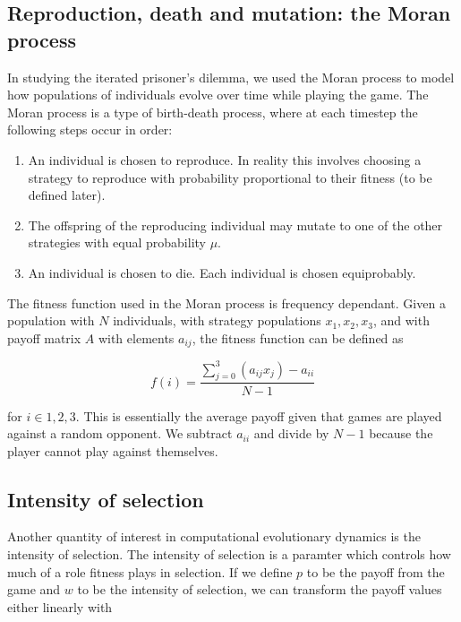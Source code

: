 \subsection{Reproduction, death and mutation: the Moran process}

In studying the iterated prisoner's dilemma, we used the Moran process to model how populations of individuals evolve over time while playing the game.
The Moran process is a type of birth-death process, where at each timestep the following steps occur in order:

\begin{enumerate}
    \item An individual is chosen to reproduce. In reality this involves choosing a strategy to reproduce with probability proportional to their fitness (to be defined later).
    \item The offspring of the reproducing individual may mutate to one of the other strategies with equal probability $\mu$.
    \item An individual is chosen to die. Each individual is chosen equiprobably.
\end{enumerate}

The fitness function used in the Moran process is frequency dependant.
Given a population with $N$ individuals, with strategy populations $x_1, x_2, x_3$, and with payoff matrix $A$ with elements $a_{ij}$, the fitness function can be defined as

\begin{equation*}
    f(i) = \frac{\sum_{j = 0}^3 (a_{ij} x_j) - a_{ii} }{N - 1}
\end{equation*}

for $i \in 1, 2, 3$.
This is essentially the average payoff given that games are played against a random opponent.
We subtract $a_{ii}$ and divide by $N - 1$ because the player cannot play against themselves.

\subsection{Intensity of selection}

Another quantity of interest in computational evolutionary dynamics is the intensity of selection.
The intensity of selection is a paramter which controls how much of a role fitness plays in selection.
If we define $p$ to be the payoff from the game and $w$ to be the intensity of selection, we can transform the payoff values either linearly with

